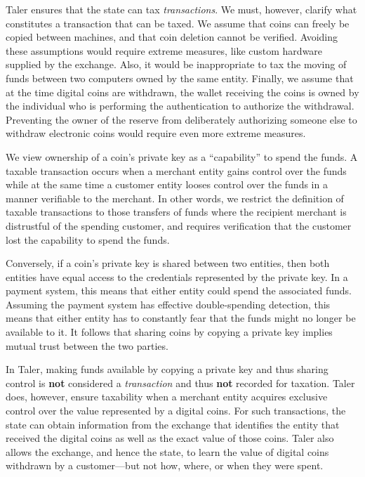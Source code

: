 \documentclass[sigconf, authordraft]{acmart}
\begin{document}
Taler ensures that the state can tax {\em transactions}.  We must,
however, clarify what constitutes a transaction that can be taxed.
We assume that coins can freely be
copied between machines, and that coin deletion cannot be verified.
Avoiding these assumptions would require extreme measures, like custom
hardware supplied by the exchange.  Also, it would be inappropriate to
tax the moving of funds between two computers owned by the same
entity.  Finally, we assume that at the time digital coins are
withdrawn, the wallet receiving the coins is owned by the individual
who is performing the authentication to authorize the withdrawal.
Preventing the owner of the reserve from deliberately authorizing
someone else to withdraw electronic coins would require even more
extreme measures.

We view ownership of a coin's private key as a ``capability'' to spend
the funds.  A taxable transaction occurs when a merchant entity gains
control over the funds while at the same time a customer entity looses
control over the funds in a manner verifiable to the merchant.  In
other words, we restrict the definition of taxable transactions to
those transfers of funds where the recipient merchant is distrustful
of the spending customer, and requires verification that the customer
lost the capability to spend the funds.

Conversely, if a coin's private key is shared between two entities,
then both entities have equal access to the credentials represented by
the private key.  In a payment system, this means that either entity
could spend the associated funds.  Assuming the payment system has
effective double-spending detection, this means that either entity has
to constantly fear that the funds might no longer be available to it.
It follows that sharing coins by copying a private key implies mutual
trust between the two parties.

In Taler, making funds available by copying a private key and thus
sharing control is {\bf not} considered a {\em transaction} and thus
{\bf not} recorded for taxation.  Taler does, however, ensure
taxability when a merchant entity acquires exclusive control over the
value represented by a digital coins.  For such transactions, the state
can obtain information from the exchange that identifies
the entity that received the digital coins as well as the exact value
of those coins.  Taler also allows the exchange, and hence the state,
to learn the value of digital coins withdrawn by a customer---but not
how, where, or when they were spent.
\end{document}
